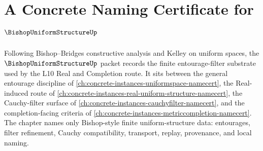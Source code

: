 \chapter{A Concrete Naming Certificate for $\BishopUniformStructureUp$}
\label{ch:concrete-instances-bishop-uniform-structure-namecert}

Following Bishop--Bridges constructive analysis and Kelley on uniform spaces, the $\BishopUniformStructureUp$ packet records the finite entourage-filter substrate used by the L10 Real and Completion route. It sits between the general entourage discipline of \autoref{ch:concrete-instances-uniformspace-namecert}, the Real-induced route of \autoref{ch:concrete-instances-real-uniform-structure-namecert}, the Cauchy-filter surface of \autoref{ch:concrete-instances-cauchyfilter-namecert}, and the completion-facing criteria of \autoref{ch:concrete-instances-metriccompletion-namecert}. The chapter names only Bishop-style finite uniform-structure data: entourages, filter refinement, Cauchy compatibility, transport, replay, provenance, and local naming.


